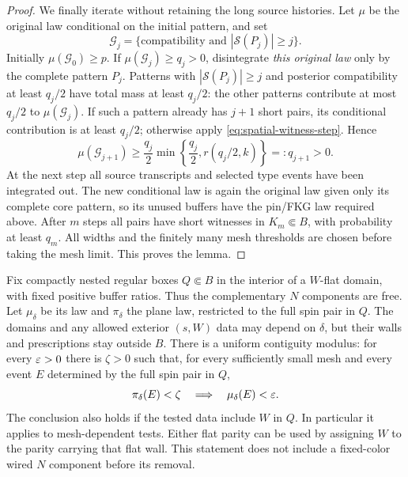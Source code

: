 \begin{proof}
We finally iterate without retaining the long source histories.
Let $\mu$ be the original law conditional on the initial pattern,
and set
\[
 \mathcal G_j=\{\text{compatibility and }|\mathcal S(P_j)|\ge j\}.
\]
Initially $\mu(\mathcal G_0)\ge p$. If
$\mu(\mathcal G_j)\ge q_j>0$, disintegrate \emph{this original law}
only by the complete pattern $P_j$. Patterns with
$|\mathcal S(P_j)|\ge j$ and posterior compatibility at least
$q_j/2$ have total mass at least $q_j/2$: the other patterns
contribute at most $q_j/2$ to $\mu(\mathcal G_j)$. If such a
pattern already has $j+1$ short pairs, its conditional contribution
is at least $q_j/2$; otherwise apply
\eqref{eq:spatial-witness-step}. Hence
\[
 \mu(\mathcal G_{j+1})\ge
       \frac{q_j}{2}\min\left\{\frac{q_j}{2},
                                  r(q_j/2,k)\right\}
             =:q_{j+1}>0.
\]
At the next step all source transcripts and selected type events
have been integrated out. The new conditional law is again the
original law given only its complete core pattern, so its unused
buffers have the pin/FKG law required above. After $m$ steps all
pairs have short witnesses in $K_m\Subset B$, with probability
at least $q_m$. All widths and the finitely many mesh thresholds
are chosen before taking the mesh limit. This proves the lemma.
\end{proof}

\begin{proposition}
\label{prop:full-contiguity}
Fix compactly nested regular boxes $Q\Subset B$ in the interior
of a $W$-flat domain, with fixed positive buffer ratios. Thus the
complementary $N$ components are free. Let $\mu_\delta$
be its law and $\pi_\delta$ the plane law, restricted to the full
spin pair in $Q$. The domains and any allowed exterior $(s,W)$
data may depend on $\delta$, but their walls and prescriptions stay
outside $B$. There is a uniform contiguity modulus: for every
$\varepsilon>0$ there is $\zeta>0$ such that, for every sufficiently small
mesh and every event $E$ determined by the full spin pair in $Q$,
\begin{equation}\label{eq:spatial-contiguity}
             \pi_\delta(E)<\zeta
           \quad\Longrightarrow\quad
             \mu_\delta(E)<\varepsilon.
\end{equation}
The conclusion also holds if the tested data include $W$ in $Q$.
In particular it applies to mesh-dependent tests. Either flat
parity can be used by assigning $W$ to the parity carrying that
flat wall. This statement does not include a fixed-color wired
$N$ component before its removal.
\end{proposition}

